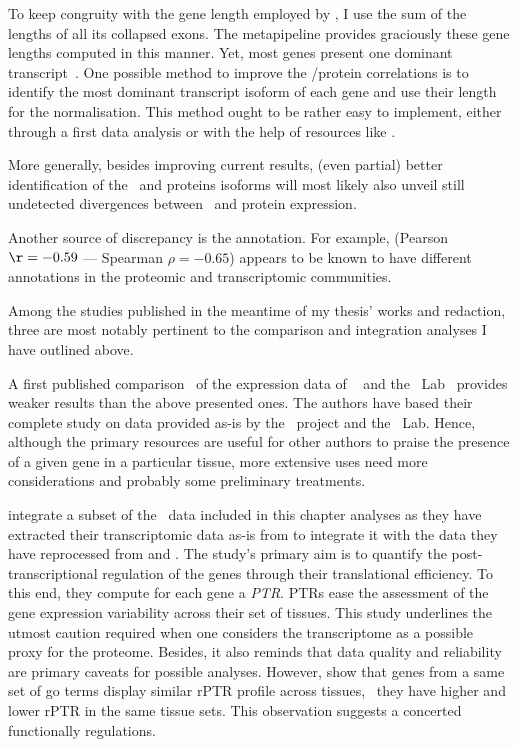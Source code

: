 To keep congruity with the gene length
employed by ,
I use the sum of the lengths of all its collapsed exons.
The metapipeline
 provides
graciously these gene lengths computed in this manner.
Yet, most genes present one dominant transcript~.
One possible method to improve the \mRNA/protein correlations
is to identify the most dominant transcript isoform of each gene
and use their length for the normalisation.
This method ought to be rather easy to implement,
either through a first data analysis
or with the help of resources like
.

More generally,
besides improving current results,
(even partial) better identification of the \mRNAs\ and proteins isoforms
will most likely also unveil still undetected divergences
between \mRNA\ and protein expression.\mybr\

Another source of discrepancy is the annotation.
For example,  (Pearson $\r=-0.59$  --- Spearman $\rho=-0.65$)
appears to be known to have different annotations
in the proteomic and transcriptomic communities.

Among the studies published in the meantime of my thesis' works and redaction,
three are most notably pertinent to the comparison and integration analyses
I have outlined above.

A first published comparison~ of the expression data of
\gtex\  and the \pandey\ Lab~
provides weaker results than the above presented ones.
The authors have based their complete study on data provided as-is
by the \gtex\ project and the \pandey\ Lab.
Hence, although the primary resources are useful
for other authors to praise the presence of a given gene in a particular tissue,
more extensive uses need more considerations
and probably some preliminary treatments.

\citet{Franks2017-bp} integrate a subset of the \uhlen\ data included
in this chapter analyses
as they have extracted their transcriptomic data as-is from \citet{Uhlen2014}
to integrate it with the data they have reprocessed
from \citet{PandeyData} and \citet{KusterData}.
The study's primary aim is
to quantify the post-transcriptional regulation of the genes
through their translational efficiency.
To this end, they compute for each gene a \emph{\gls{PTR}}.
\glspl{PTR} ease the assessment of the gene expression variability
across their set of tissues.
This study underlines the utmost caution required
when one considers the transcriptome as a possible proxy for the proteome.
Besides, it also reminds that data quality and reliability are primary caveats
for possible analyses.
However, \citet{Franks2017-bp} show that genes from a same set of \gls{go} terms
display similar \gls{rPTR} profile across tissues,
\ie\ they have higher and lower \gls{rPTR} in the same tissue sets.
This observation suggests a concerted functionally regulations.


